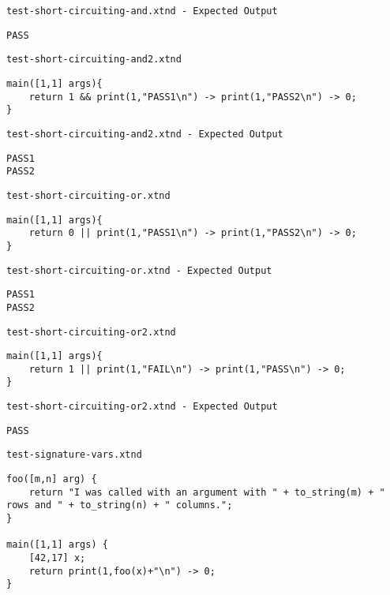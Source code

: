 \medskip \noindent \texttt{test-short-circuiting-and.xtnd - Expected Output}


\begin{lstlisting}
PASS
\end{lstlisting}


\medskip \noindent \texttt{test-short-circuiting-and2.xtnd}


\begin{lstlisting}
main([1,1] args){
	return 1 && print(1,"PASS1\n") -> print(1,"PASS2\n") -> 0;
}
\end{lstlisting}


\medskip \noindent \texttt{test-short-circuiting-and2.xtnd - Expected Output}


\begin{lstlisting}
PASS1
PASS2
\end{lstlisting}


\medskip \noindent \texttt{test-short-circuiting-or.xtnd}


\begin{lstlisting}
main([1,1] args){
	return 0 || print(1,"PASS1\n") -> print(1,"PASS2\n") -> 0;
}
\end{lstlisting}


\medskip \noindent \texttt{test-short-circuiting-or.xtnd - Expected Output}


\begin{lstlisting}
PASS1
PASS2
\end{lstlisting}


\medskip \noindent \texttt{test-short-circuiting-or2.xtnd}


\begin{lstlisting}
main([1,1] args){
	return 1 || print(1,"FAIL\n") -> print(1,"PASS\n") -> 0;
}
\end{lstlisting}


\medskip \noindent \texttt{test-short-circuiting-or2.xtnd - Expected Output}


\begin{lstlisting}
PASS
\end{lstlisting}


\medskip \noindent \texttt{test-signature-vars.xtnd}


\begin{lstlisting}
foo([m,n] arg) {
	return "I was called with an argument with " + to_string(m) + " rows and " + to_string(n) + " columns.";
}

main([1,1] args) {
	[42,17] x;
	return print(1,foo(x)+"\n") -> 0;
}
\end{lstlisting}


